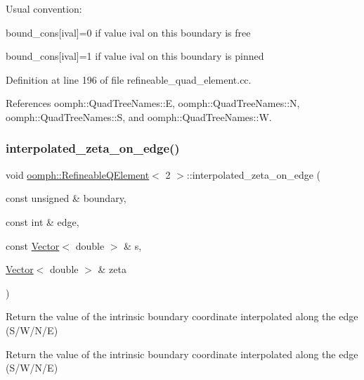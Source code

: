 Usual convention\+:
\begin{DoxyItemize}
\item bound\+\_\+cons\mbox{[}ival\mbox{]}=0 if value ival on this boundary is free
\item bound\+\_\+cons\mbox{[}ival\mbox{]}=1 if value ival on this boundary is pinned 
\end{DoxyItemize}

Definition at line 196 of file refineable\+\_\+quad\+\_\+element.\+cc.



References oomph\+::\+Quad\+Tree\+Names\+::E, oomph\+::\+Quad\+Tree\+Names\+::N, oomph\+::\+Quad\+Tree\+Names\+::S, and oomph\+::\+Quad\+Tree\+Names\+::W.

\mbox{\label{classoomph_1_1RefineableQElement_3_012_01_4_af7796513af01efa2ad009876e81abe3b}} 
\subsubsection{\texorpdfstring{interpolated\+\_\+zeta\+\_\+on\+\_\+edge()}{interpolated\_zeta\_on\_edge()}}
{\footnotesize\ttfamily void \hyperlink{classoomph_1_1RefineableQElement}{oomph\+::\+Refineable\+Q\+Element}$<$ 2 $>$\+::interpolated\+\_\+zeta\+\_\+on\+\_\+edge (\begin{DoxyParamCaption}\item[{const unsigned \&}]{boundary,  }\item[{const int \&}]{edge,  }\item[{const \hyperlink{classoomph_1_1Vector}{Vector}$<$ double $>$ \&}]{s,  }\item[{\hyperlink{classoomph_1_1Vector}{Vector}$<$ double $>$ \&}]{zeta }\end{DoxyParamCaption})}



Return the value of the intrinsic boundary coordinate interpolated along the edge (S/\+W/\+N/E) 

Return the value of the intrinsic boundary coordinate interpolated along the edge (S/\+W/\+N/E) 


